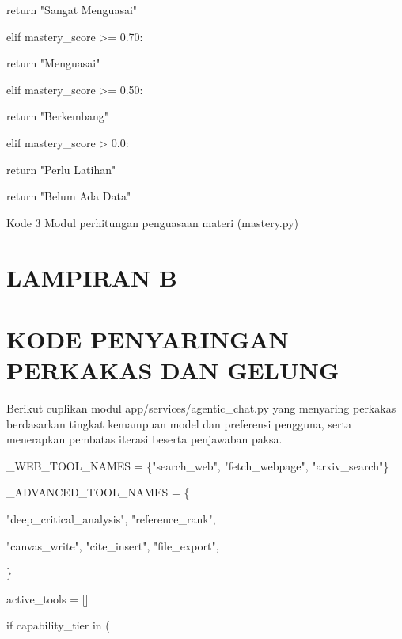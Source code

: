 \documentclass[12pt,a4paper]{article}
\begin{document}
return "Sangat Menguasai"



elif mastery\_score \textgreater{}= 0.70:



return "Menguasai"



elif mastery\_score \textgreater{}= 0.50:



return "Berkembang"



elif mastery\_score \textgreater{} 0.0:



return "Perlu Latihan"



return "Belum Ada Data"



Kode 3	Modul perhitungan penguasaan materi (mastery.py)



\section*{LAMPIRAN B}

\section*{KODE PENYARINGAN PERKAKAS DAN GELUNG}

Berikut cuplikan modul app/services/agentic\_chat.py yang menyaring perkakas berdasarkan tingkat kemampuan model dan preferensi pengguna, serta menerapkan pembatas iterasi beserta penjawaban paksa.



\_WEB\_TOOL\_NAMES = \{"search\_web", "fetch\_webpage", "arxiv\_search"\}



\_ADVANCED\_TOOL\_NAMES = \{



"deep\_critical\_analysis", "reference\_rank",



"canvas\_write", "cite\_insert", "file\_export",



\}



active\_tools = {[}{]}



if capability\_tier in (
\end{document}
